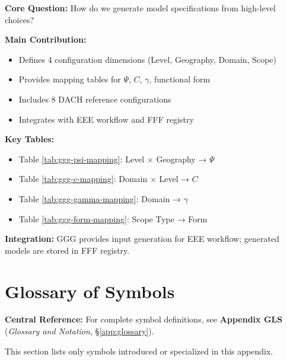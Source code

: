 \begin{tcolorbox}[colback=green!10!white, colframe=green!75!black,
    title=\textbf{Appendix CFG: Summary}]

\textbf{Core Question:} How do we generate model specifications from high-level choices?

\textbf{Main Contribution:}
\begin{itemize}[nosep]
    \item Defines 4 configuration dimensions (Level, Geography, Domain, Scope)
    \item Provides mapping tables for $\Psi$, $C$, $\gamma$, functional form
    \item Includes 8 DACH reference configurations
    \item Integrates with EEE workflow and FFF registry
\end{itemize}

\textbf{Key Tables:}
\begin{itemize}[nosep]
    \item Table \ref{tab:ggg-psi-mapping}: Level × Geography → $\Psi$
    \item Table \ref{tab:ggg-c-mapping}: Domain × Level → $C$
    \item Table \ref{tab:ggg-gamma-mapping}: Domain → $\gamma$
    \item Table \ref{tab:ggg-form-mapping}: Scope Type → Form
\end{itemize}

\textbf{Integration:} GGG provides input generation for EEE workflow;
generated models are stored in FFF registry.

\end{tcolorbox}


\section{Glossary of Symbols}
\label{sec:ggg-glossary}

\begin{tcolorbox}[colback=blue!5!white, colframe=blue!75!black]
\textbf{Central Reference:} For complete symbol definitions, see
\textbf{Appendix GLS} (\textit{Glossary and Notation}, \S\ref{app:glossary}).

This section lists only symbols introduced or specialized in this appendix.
\end{tcolorbox}

